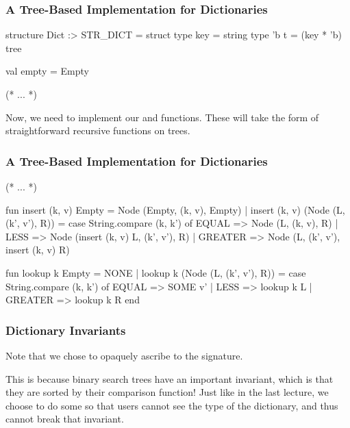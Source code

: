 \documentclass[aspectratio=169, handout]{beamer}
\begin{document}
\begin{frame}[fragile]
  \frametitle{A Tree-Based Implementation for Dictionaries}

  \begin{codeblock}
    structure Dict :> STR_DICT =
      struct
        type key = string
        type 'b t = (key * 'b) tree

        val empty = Empty

        (* ... *)
  \end{codeblock}

  \pause
  \vspace{\fill}

  Now, we need to implement our  and  functions.
  These will take the form of straightforward recursive functions on trees.

  \pause
  \vspace{\fill}

\end{frame}

\begin{frame}[fragile]
  \frametitle{A Tree-Based Implementation for Dictionaries}
  \small
  \begin{codeblock}
    (* ... *)

      fun insert (k, v) Empty = Node (Empty, (k, v), Empty)
        | insert (k, v) (Node (L, (k', v'), R)) =
            case String.compare (k, k') of
              EQUAL   => Node (L, (k, v), R)
            | LESS    => Node (insert (k, v) L, (k', v'), R)
            | GREATER => Node (L, (k', v'), insert (k, v) R)

      fun lookup k Empty = NONE
        | lookup k (Node (L, (k', v'), R)) =
            case String.compare (k, k') of
              EQUAL   => SOME v'
            | LESS    => lookup k L
            | GREATER => lookup k R
    end
\end{codeblock}
\end{frame}

\begin{frame}[fragile]
  \frametitle{Dictionary Invariants}

  Note that we chose to opaquely ascribe to the  signature.

  \pause
  \vspace{\fill}

  This is because binary search trees have an important invariant, which
  is that they are sorted by their comparison function! Just like in the
  last lecture, we choose to do some  so that
  users cannot see the type of the dictionary, and thus cannot break that
  invariant.
\end{frame}
\end{document}
